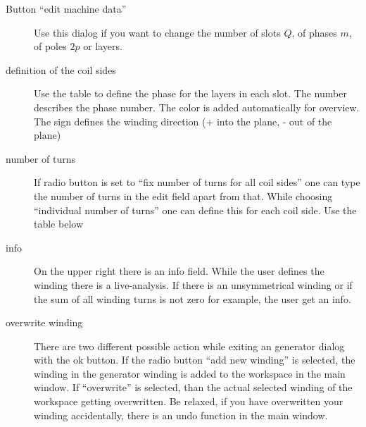 \documentclass[]{scrreprt}
\begin{document}
\begin{description}
 \item[Button "`edit machine data"'] Use this dialog if you want to change the number of slots $Q$,
          of phases $m$, of poles $2p$ or layers.
 \item[definition of the coil sides] Use the table to define the phase for the layers in each slot.
          The number describes the phase number. The color is added automatically for overview. The 
          sign defines the winding direction (+ into the plane, - out of the plane)
 \item[number of turns] If radio button is set to "`fix number of turns for all coil sides"' one can
          type the number of turns in the edit field apart from that. While choosing "`individual
          number of turns"' one can define this for each coil side. Use the table below 
 \item[info] On the upper right there is an info field. While the user defines the winding there is
          a live-analysis. If there is an unsymmetrical winding or if the sum of all winding turns is not 
          zero for example, the user get an info.
 \item[overwrite winding] There are two different possible action while exiting an generator dialog with
          the ok button. If the radio button "`add new winding"' is selected, the winding in the generator
          winding is added to the workspace in the main window. If "`overwrite"' is selected, than the 
          actual selected winding of the workspace getting overwritten. Be relaxed, if you have overwritten
          your winding accidentally, there is an undo function in the main window.
\end{description}
%
%
\FloatBarrier
\end{document}
